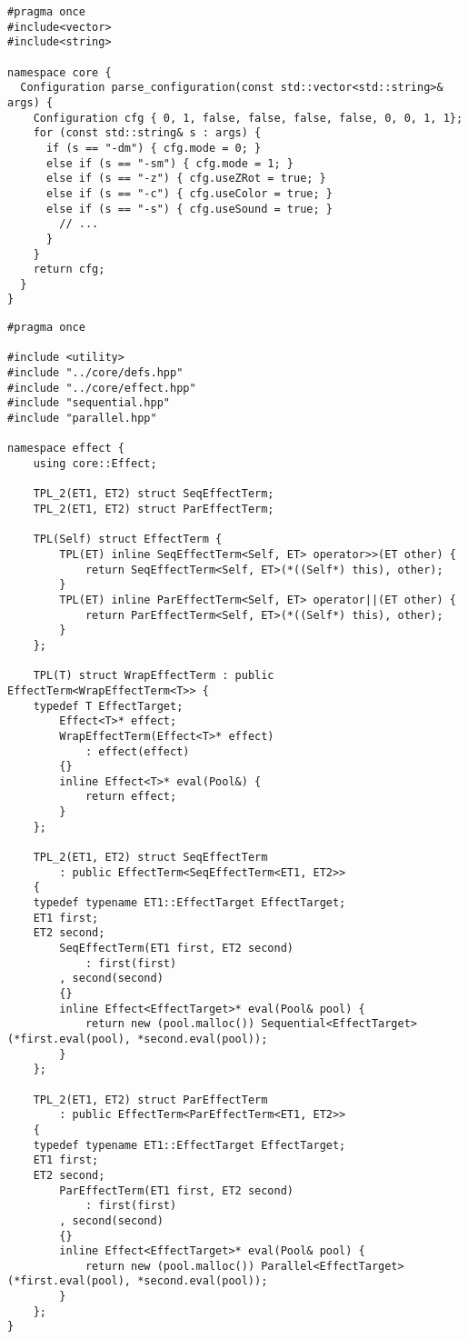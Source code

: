 \begin{lstlisting}[caption=configuration.hpp]
#pragma once
#include<vector>
#include<string>

namespace core {
  Configuration parse_configuration(const std::vector<std::string>& args) {
    Configuration cfg { 0, 1, false, false, false, false, 0, 0, 1, 1};
    for (const std::string& s : args) {
      if (s == "-dm") { cfg.mode = 0; }
      else if (s == "-sm") { cfg.mode = 1; }
      else if (s == "-z") { cfg.useZRot = true; }
      else if (s == "-c") { cfg.useColor = true; }
      else if (s == "-s") { cfg.useSound = true; }
        // ...
      }
    }
    return cfg;
  }
}
\end{lstlisting}

\begin{lstlisting}[caption=effect/algebra.hpp]
#pragma once

#include <utility>
#include "../core/defs.hpp"
#include "../core/effect.hpp"
#include "sequential.hpp"
#include "parallel.hpp"

namespace effect {
    using core::Effect;

    TPL_2(ET1, ET2) struct SeqEffectTerm;
    TPL_2(ET1, ET2) struct ParEffectTerm;

    TPL(Self) struct EffectTerm {
        TPL(ET) inline SeqEffectTerm<Self, ET> operator>>(ET other) {
            return SeqEffectTerm<Self, ET>(*((Self*) this), other);
        }
        TPL(ET) inline ParEffectTerm<Self, ET> operator||(ET other) {
            return ParEffectTerm<Self, ET>(*((Self*) this), other);
        }
    };

    TPL(T) struct WrapEffectTerm : public EffectTerm<WrapEffectTerm<T>> {
	typedef T EffectTarget;
        Effect<T>* effect;
        WrapEffectTerm(Effect<T>* effect)
            : effect(effect)
        {}
        inline Effect<T>* eval(Pool&) {
            return effect;
        }
    };

    TPL_2(ET1, ET2) struct SeqEffectTerm
        : public EffectTerm<SeqEffectTerm<ET1, ET2>>
    {
	typedef typename ET1::EffectTarget EffectTarget;
	ET1 first;
	ET2 second;
        SeqEffectTerm(ET1 first, ET2 second)
            : first(first)
	    , second(second)
        {}
        inline Effect<EffectTarget>* eval(Pool& pool) {
            return new (pool.malloc()) Sequential<EffectTarget>(*first.eval(pool), *second.eval(pool));
        }
    };

    TPL_2(ET1, ET2) struct ParEffectTerm
        : public EffectTerm<ParEffectTerm<ET1, ET2>>
    {
	typedef typename ET1::EffectTarget EffectTarget;
	ET1 first;
	ET2 second;
        ParEffectTerm(ET1 first, ET2 second)
            : first(first)
	    , second(second)
        {}
        inline Effect<EffectTarget>* eval(Pool& pool) {
            return new (pool.malloc()) Parallel<EffectTarget>(*first.eval(pool), *second.eval(pool));
        }
    };
}
\end{lstlisting}

